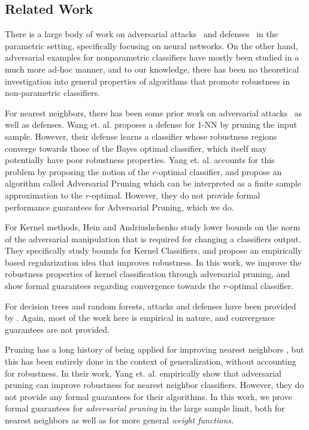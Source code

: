 \subsection{Related Work}

There is a large body of work on adversarial attacks~\cite{Carlini17, Liu17, Papernot17, Papernot16,Szegedy14} and defenses~\cite{Hein17,Katz17,Schmidt18,Wu16,Steinhardt18, Sinha18} in the parametric setting, specifically focusing on neural networks. On the other hand, adversarial examples for nonparametric classifiers have mostly been studied in a much more ad-hoc manner, and to our knowledge, there has been no theoretical investigation into general properties of algorithms that promote robustness in non-parametric classifiers.

For nearest neighbors, there has been some prior work on adversarial attacks~\cite{Amsaleg17, Sitawarin19, WJC18, YRWC19} as well as defenses. Wang et. al. \cite{WJC18} proposes a defense for 1-NN by pruning the input sample. However, their defense learns a classifier whose robustness regions converge towards those of the Bayes optimal classifier, which itself may potentially have poor robustness properties. Yang et. al. \cite{YRWC19} accounts for this problem by proposing the notion of the $r$-optimal classifier, and propose an algorithm called Adversarial Pruning which can be interpreted as a finite sample approximation to the $r$-optimal. However, they do not provide formal performance guarantees for Adversarial Pruning, which we do. 

For Kernel methods, Hein and Andriushchenko \cite{Hein17} study lower bounds on the norm of the adversarial manipulation that is required for changing a classifiers output. They specifically study bounds for Kernel Classifiers, and propose an empirically based regularization idea that improves robustness. In this work, we improve the robustness properties of kernel classification through adversarial pruning, and show formal guarantees regarding convergence towards the $r$-optimal classifier. 

For decision trees and random forests, attacks and defenses have been provided by \cite{Hein19, Kantchelian15, Hsiehicml19}. Again, most of the work here is empirical in nature, and convergence guarantees are not provided. 

Pruning has a long history of being applied for improving nearest neighbors \cite{Gates72, Gottlieb14, Hart68, KontorovichSW17, KontorovichW15, Hanneke19}, but this has been entirely done in the context of generalization, without accounting for robustness. In their work, Yang et. al. empirically show that adversarial pruning can improve robustness for nearest neighbor classifiers. However, they do not provide any formal guarantees for their algorithms. In this work, we prove formal guarantees for \textit{adversarial pruning} in the large sample limit, both for nearest neighbors as well as for more general \textit{weight functions.} 

